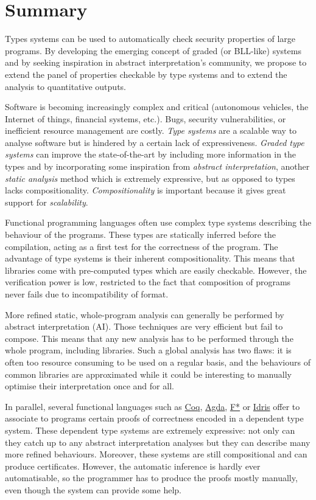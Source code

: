 \documentclass{article}[11pt]
\begin{document}
\newpage


\section{Summary}
Types systems can be used to automatically check security properties of large programs. By developing the emerging concept of graded (or BLL-like) systems and by seeking inspiration in abstract interpretation's community, we propose to extend the panel of properties checkable by type systems and to extend the analysis to quantitative outputs.

Software is becoming increasingly complex and critical (autonomous vehicles, the Internet of things, financial systems, etc.). Bugs, security vulnerabilities, or inefficient resource management are costly. {\em Type systems} are a scalable way to analyse software but is hindered by a certain lack of expressiveness. {\em Graded type systems} can improve the state-of-the-art by including more information in the types and by incorporating some inspiration from {\em abstract interpretation}, another {\em static analysis} method which is extremely expressive, but as opposed to types lacks compositionality. {\em Compositionality} is important because it gives great support for {\em scalability}.

Functional programming languages often use complex type systems describing the behaviour of the programs. These types are statically inferred before the compilation, acting as a first test for the correctness of the program. The advantage of type systems is their inherent compositionality. This means that libraries come with pre-computed types which are easily checkable. However, the verification power is low, restricted to the fact that composition of programs never fails due to incompatibility of format.

More refined static, whole-program analysis can generally be performed by abstract interpretation (AI). Those techniques are very efficient but fail to compose. This means that any new analysis has to be performed through the whole program, including libraries. Such a global analysis has two flaws: it is often too resource consuming to be used on a regular basis, and the behaviours of common libraries are approximated while it could be interesting to manually optimise their interpretation once and for all.

In parallel, several functional languages such as \href{https://coq.inria.fr/}{Coq}, \href{http://wiki.portal.chalmers.se/agda/pmwiki.php}{Agda}, \href{https://www.fstar-lang.org/}{F*} or \href{http://www.idris-lang.org/}{Idris} offer to associate to programs certain proofs of correctness encoded in a dependent type system. These dependent type systems are extremely expressive: not only can they catch up to any abstract interpretation analyses but they can describe many more refined behaviours. Moreover, these systems are still compositional and can produce certificates. However, the automatic inference is hardly ever automatisable, so the programmer has to produce the proofs mostly manually, even though the system can provide some help.
\end{document}
